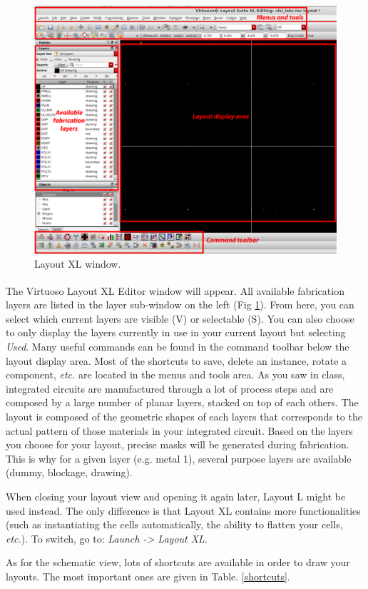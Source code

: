 \begin{enumerate}
	
	\parbox[t]{\dimexpr\textwidth-\leftmargin}{%
		\begin{figure}
			\vspace{-0mm}
			\centering
			\vspace{-\baselineskip}
			\includegraphics[scale=0.25]{figures/lab2_layout/layout.pdf}
			\caption{Layout XL window.}
			\label{fig_layoutwin}
		\end{figure}
		\item The Virtuoso\textsuperscript{\tiny\textregistered} Layout XL Editor window will appear. All available fabrication layers are listed in the layer sub-window on the left (Fig \ref{fig_layoutwin}). From here, you can select which current layers are visible (V) or selectable (S). You can also choose to only display the layers currently in use in your current layout but selecting \textit{Used}. Many useful commands can be found in the command toolbar below the layout display area. Most of the shortcuts to save, delete an instance, rotate a component, \textit{etc.} are located in the menus and tools area.
		As you saw in class, integrated circuits are manufactured through a lot of process steps and are composed by a large number of planar layers, stacked on top of each others. The layout is composed of the geometric shapes of each layers that corresponds to the actual pattern of those materials in your integrated circuit. Based on the layers you choose for your layout, precise masks will be generated during fabrication. This is why for a given layer (e.g. metal 1), several purpose layers are available (dummy, blockage, drawing).}
	\begin{remark}
		When closing your layout view and opening it again later, Layout L might be used instead. The only difference is that Layout XL contains more functionalities (such as instantiating the cells automatically, the ability to flatten your cells, \textit{etc.}). To switch, go to: \textit{Launch -> Layout XL}. 
	\end{remark}
	\clearpage
	As for the schematic view, lots of shortcuts are available in order to draw your layouts. The most important ones are given in Table. \ref{shortcuts}.


\end{enumerate}
